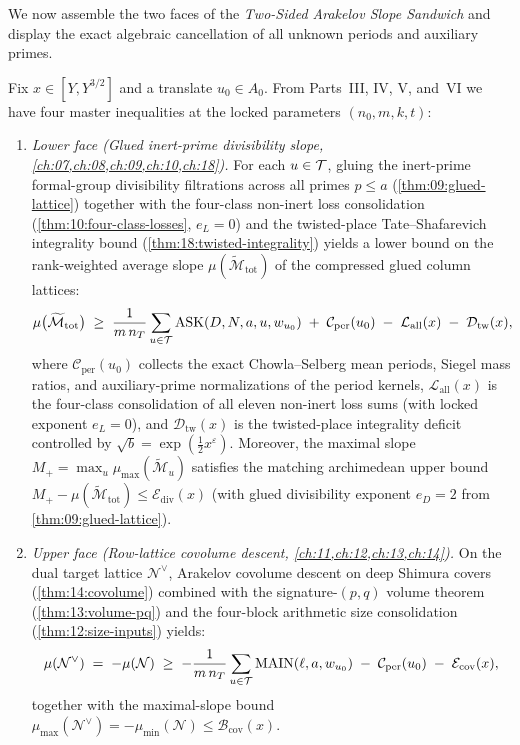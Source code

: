 We now assemble the two faces of the \emph{Two-Sided Arakelov Slope Sandwich} and display the exact algebraic cancellation of all unknown periods and auxiliary primes.

Fix $x \in [Y, Y^{3/2}]$ and a translate $u_0 \in A_0$. From Parts~III, IV, V, and~VI we have four master inequalities at the locked parameters $(n_0, m, k, t)$:
\begin{enumerate}[label=\textup{(\textbf{Face~\arabic*})}]
\item \emph{Lower face (Glued inert-prime divisibility slope, \cref{ch:07,ch:08,ch:09,ch:10,ch:18}).}
  For each $u \in \mathcal{T}$, gluing the inert-prime formal-group divisibility filtrations across all primes $p \le a$ (\cref{thm:09:glued-lattice}) together with the four-class non-inert loss consolidation (\cref{thm:10:four-class-losses}, $e_L = 0$) and the twisted-place Tate--Shafarevich integrality bound (\cref{thm:18:twisted-integrality}) yields a lower bound on the rank-weighted average slope $\mu(\widetilde{\mathcal{M}}_{\mathrm{tot}})$ of the compressed glued column lattices:
  \begin{equation}
  \label{eq:06:lower-face}
    \mu\bigl(\widetilde{\mathcal{M}}_{\mathrm{tot}}\bigr)
    \;\ge\; \frac{1}{m\, n_T}\sum_{u \in \mathcal{T}} \mathrm{ASK}(D, N, a, u, w_{u_0})
    \;+\; \mathcal{C}_{\mathrm{per}}(u_0)
    \;-\; \mathcal{L}_{\mathrm{all}}(x)
    \;-\; \mathcal{D}_{\mathrm{tw}}(x),
  \end{equation}
  where $\mathcal{C}_{\mathrm{per}}(u_0)$ collects the exact Chowla--Selberg mean periods, Siegel mass ratios, and auxiliary-prime normalizations of the period kernels, $\mathcal{L}_{\mathrm{all}}(x)$ is the four-class consolidation of all eleven non-inert loss sums (with locked exponent $e_L = 0$), and $\mathcal{D}_{\mathrm{tw}}(x)$ is the twisted-place integrality deficit controlled by $\sqrt{b} = \exp(\frac{1}{2}x^\varepsilon)$. Moreover, the maximal slope $M_+ = \max_u \mu_{\max}(\widetilde{\mathcal{M}}_u)$ satisfies the matching archimedean upper bound $M_+ - \mu(\widetilde{\mathcal{M}}_{\mathrm{tot}}) \le \mathcal{E}_{\mathrm{div}}(x)$ (with glued divisibility exponent $e_D = 2$ from \cref{thm:09:glued-lattice}).

\item \emph{Upper face (Row-lattice covolume descent, \cref{ch:11,ch:12,ch:13,ch:14}).}
  On the dual target lattice $\mathcal{N}^\vee$, Arakelov covolume descent on deep Shimura covers (\cref{thm:14:covolume}) combined with the signature-$(p,q)$ volume theorem (\cref{thm:13:volume-pq}) and the four-block arithmetic size consolidation (\cref{thm:12:size-inputs}) yields:
  \begin{equation}
  \label{eq:06:upper-face}
    \mu(\mathcal{N}^\vee)
    \;=\; -\mu(\mathcal{N})
    \;\ge\; -\frac{1}{m\, n_T}\sum_{u \in \mathcal{T}} \mathrm{MAIN}(\ell, a, w_{u_0})
    \;-\; \mathcal{C}_{\mathrm{per}}(u_0)
    \;-\; \mathcal{E}_{\mathrm{cov}}(x),
  \end{equation}
  together with the maximal-slope bound $\mu_{\max}(\mathcal{N}^\vee) = -\mu_{\min}(\mathcal{N}) \le \mathcal{B}_{\mathrm{cov}}(x)$.
\end{enumerate}

